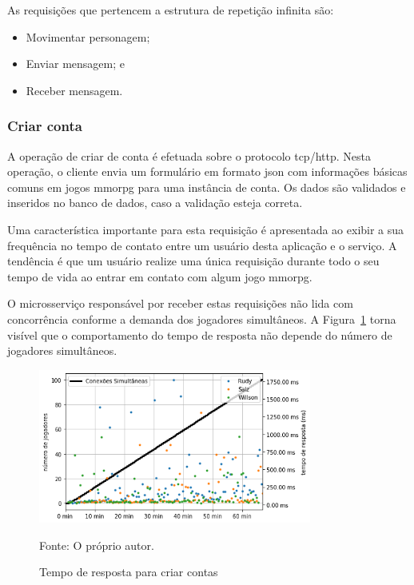 As requisições que pertencem a estrutura de repetição infinita são:

\begin{itemize}
    \item Movimentar personagem;
    \item Enviar mensagem; e
    \item Receber mensagem.
\end{itemize}


\subsubsection{Criar conta}
\label{sec:op_create_account}

A operação de criar de conta é efetuada sobre o protocolo \ac{tcp}/\ac{http}.
%
Nesta operação, o cliente envia um formulário em formato \ac{json} com informações básicas comuns em jogos \ac{mmorpg} para uma instância de conta.
%
Os dados são validados e inseridos no banco de dados, caso a validação esteja correta.

Uma característica importante para esta requisição é apresentada ao exibir a sua frequência no tempo de contato entre um usuário desta aplicação e o serviço.
%
A tendência é que um usuário realize uma única requisição durante todo o seu tempo de vida ao entrar em contato com algum jogo \ac{mmorpg}.

O microsserviço responsável por receber estas requisições não lida com concorrência conforme a demanda dos jogadores simultâneos.
%
A Figura~\ref{fig:create_account_operation_request_time} torna visível que o comportamento do tempo de resposta não depende do número de jogadores simultâneos.

\begin{figure}[htb!]
  \caption{Tempo de resposta para criar contas}
  \label{fig:create_account_operation_request_time}
  \includegraphics[width=0.8\textwidth]{figuras/analise/rt/create_account_operation_request_time.png}
  \centering

  Fonte: O próprio autor.
\end{figure}

